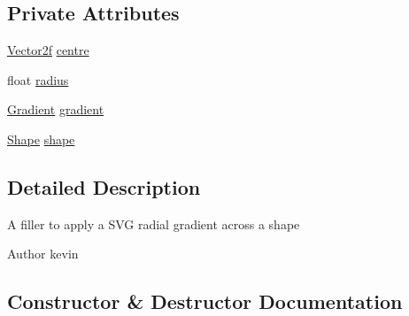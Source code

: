 \subsection*{Private Attributes}
\begin{DoxyCompactItemize}
\item 
\mbox{\hyperlink{classorg_1_1newdawn_1_1slick_1_1geom_1_1_vector2f}{Vector2f}} \mbox{\hyperlink{classorg_1_1newdawn_1_1slick_1_1svg_1_1_radial_gradient_fill_a1ce1146036d333abb455c94451b2649d}{centre}}
\item 
float \mbox{\hyperlink{classorg_1_1newdawn_1_1slick_1_1svg_1_1_radial_gradient_fill_ad4815b0655b2098a41b293439bc83bd6}{radius}}
\item 
\mbox{\hyperlink{classorg_1_1newdawn_1_1slick_1_1svg_1_1_gradient}{Gradient}} \mbox{\hyperlink{classorg_1_1newdawn_1_1slick_1_1svg_1_1_radial_gradient_fill_acabcc0fa37af23d8451201c035fc4cfd}{gradient}}
\item 
\mbox{\hyperlink{classorg_1_1newdawn_1_1slick_1_1geom_1_1_shape}{Shape}} \mbox{\hyperlink{classorg_1_1newdawn_1_1slick_1_1svg_1_1_radial_gradient_fill_aad26e36b37c63657649bf34da1dcc075}{shape}}
\end{DoxyCompactItemize}


\subsection{Detailed Description}
A filler to apply a S\+VG radial gradient across a shape

\begin{DoxyAuthor}{Author}
kevin 
\end{DoxyAuthor}


\subsection{Constructor \& Destructor Documentation}
\mbox{\label{classorg_1_1newdawn_1_1slick_1_1svg_1_1_radial_gradient_fill_a6868e613687dd66b50637f2f5a2bc8ee}} 
